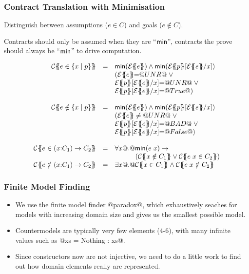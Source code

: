 \documentclass[serif,professionalfont]{beamer}
\begin{document}
\begin{frame}[fragile]
  \frametitle{Contract Translation with Minimisation}

  Distinguish between assumptions ($e \in C$) and goals ($e \notin C$).

  Contracts should only be assumed
  when they are ``$\mathsf{min}$'', contracts the prove should always be
  ``$\mathsf{min}$'' to drive computation.

  \[\begin{array}{rcl}
  \trc{e \in \{x \mid p \}}
    & = &      \Min(\etrans{}{}{e}) \land \Min(\etrans{}{}{p}[\etrans{}{}{e}/x]) \\
    &   &      (\etrans{}{}{e} {=} \unr \; \lor \; \\
    &   &      \etrans{}{}{p}[\etrans{}{}{e}/x] {=} \unr \; \lor \; \\
    &   &      \etrans{}{}{p}[\etrans{}{}{e}/x] {=} \True)
  \\ \\
  \trc{e \notin \{x \mid p \}}
    & = &      \Min(\etrans{}{}{e}) \land \Min(\etrans{}{}{p}[\etrans{}{}{e}/x]) \\
    &   &      (\etrans{}{}{e} \neq \unr \; \lor \; \\
    &   &      \etrans{}{}{p}[\etrans{}{}{e}/x] {=} \bad \; \lor \; \\
    &   &      \etrans{}{}{p}[\etrans{}{}{e}/x] {=} \False)
  \\ \\
  \trc{e \in (x{:}C_1) \to C_2}
    & = & \forall x @.@  \Min(e\;x) \to \\
    &   & \qquad\quad (\trc{x \notin C_1} \lor \trc{e\;x \in C_2}) \\
  \trc{e \notin (x{:}C_1) \to C_2}
    & = & \exists x @.@  \trc{x \in C_1} \land \trc{e\;x \notin C_2}
  \end{array}\]

\end{frame}

\begin{frame}
  \frametitle{Finite Model Finding}

  \begin{itemize}

    \item We use the finite model finder @paradox@, which exhaustively
      seaches for models with increasing domain size and gives us the
      smallest possible model.

    \item Countermodels are typically very few elements (4-6), with many
      infinite values such as @xs = Nothing : xs@.

    \item Since constructors now are not injective, we need to do a
      little work to find out how domain elements really are
      represented.

  \end{itemize}

\end{frame}
\end{document}
